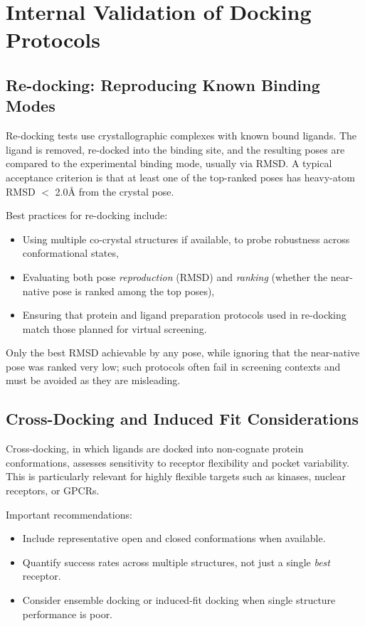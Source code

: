 \documentclass[12pt]{article}
\begin{document}
\section{Internal Validation of Docking Protocols}

\subsection{Re-docking: Reproducing Known Binding Modes}

Re-docking tests use crystallographic complexes with known bound ligands. The ligand is removed, re-docked into the binding site, and the resulting poses are compared to the experimental binding mode, usually via RMSD. A typical acceptance criterion is that at least one of the top-ranked poses has heavy-atom RMSD $<$ 2.0\r{A} from the crystal pose\cite{CH8_Warren2006,CH8_Kitchen2004,CH8_Cheng2009}.

Best practices for re-docking include:

\begin{itemize}
  \item Using multiple co-crystal structures if available, to probe robustness across conformational states,
  \item Evaluating both pose \emph{reproduction} (RMSD) and \emph{ranking} (whether the near-native pose is ranked among the top poses),
  \item Ensuring that protein and ligand preparation protocols used in re-docking match those planned for virtual screening.
\end{itemize}

Only the best RMSD achievable by any pose, while ignoring that the near-native pose was ranked very low; such protocols often fail in screening contexts and must be avoided as they are misleading. 

\subsection{Cross-Docking and Induced Fit Considerations}

Cross-docking, in which ligands are docked into non-cognate protein conformations, assesses sensitivity to receptor flexibility and pocket variability. This is particularly relevant for highly flexible targets such as kinases, nuclear receptors, or GPCRs\cite{CH8_Huang2011,CH8_PandFutureDocking2020}.

Important recommendations:

\begin{itemize}
  \item Include representative open and closed conformations when available.
  \item Quantify success rates across multiple structures, not just a single \emph{best} receptor.
  \item Consider ensemble docking or induced-fit docking when single structure performance is poor.
\end{itemize}
\end{document}
